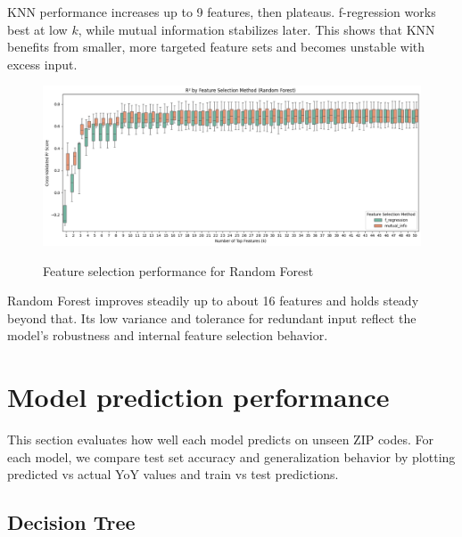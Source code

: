 KNN performance increases up to 9 features, then plateaus. f-regression works best at low $k$, while mutual information stabilizes later. This shows that KNN benefits from smaller, more targeted feature sets and becomes unstable with excess input.

\begin{figure}[!ht]
    \centering
    \includegraphics[width=\textwidth]{figures/box50_RF.png}
    \caption{Feature selection performance for Random Forest}
    \caption*{\hspace{1em}}
    \label{fig:box_rf}
\end{figure}
\FloatBarrier

Random Forest improves steadily up to about 16 features and holds steady beyond that. Its low variance and tolerance for redundant input reflect the model’s robustness and internal feature selection behavior.

\section{Model prediction performance}

This section evaluates how well each model predicts on unseen ZIP codes. For each model, we compare test set accuracy and generalization behavior by plotting predicted vs actual YoY values and train vs test predictions.

\subsection{Decision Tree}

